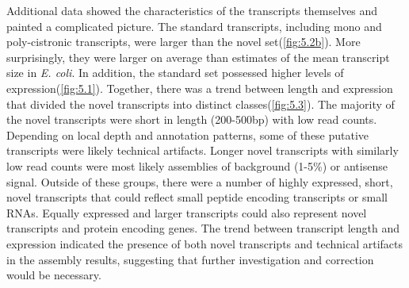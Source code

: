 Additional data showed the characteristics of the transcripts themselves and painted a complicated picture. The standard transcripts, including mono and poly-cistronic transcripts, were larger than the novel set(\ref{fig:5.2b}). More surprisingly, they were larger on average than estimates of the mean transcript size in \textit{E. coli}\cite{86}. In addition, the standard set possessed higher levels of expression(\ref{fig:5.1}). Together, there was a trend between length and expression that divided the novel transcripts into distinct classes(\ref{fig:5.3}). The majority of the novel transcripts were short in length (200-500bp) with low read counts. Depending on local depth and annotation patterns, some of these putative transcripts were likely technical artifacts. Longer novel transcripts with similarly low read counts were most likely assemblies of background (1-5\%) or antisense signal. Outside of these groups, there were a number of highly expressed, short, novel transcripts that could reflect small peptide encoding transcripts or small RNAs. Equally expressed and larger transcripts could also represent novel transcripts and protein encoding genes. The trend between transcript length and expression indicated the presence of both novel transcripts and technical artifacts in the assembly results, suggesting that further investigation and correction would be necessary.


